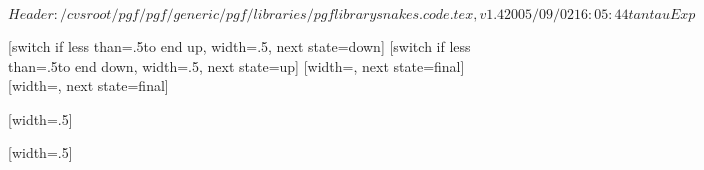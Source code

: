 \ProvidesPackageRCS[v\pgfversion] $Header: /cvsroot/pgf/pgf/generic/pgf/libraries/pgflibrarysnakes.code.tex,v 1.4 2005/09/02 16:05:44 tantau Exp $

%


\newdimen\pgfsnakewaveamplitude
\newdimen\pgfsnakewavelength
\pgfsnakewavelength=10pt
\pgfsnakewaveamplitude=2.5pt


%

{
  [switch if less than=.5\pgfsnakewavelength to end up,%
             width=.5\pgfsnakewavelength,%
             next state=down]
  {
    \pgfpathlineto{\pgfpoint{.25\pgfsnakewavelength}{\pgfsnakewaveamplitude}}
    \pgfpathlineto{\pgfpoint{.5\pgfsnakewavelength}{0pt}}
  }
  [switch if less than=.5\pgfsnakewavelength to end down,%
               width=.5\pgfsnakewavelength,%
               next state=up]
  {
    \pgfpathlineto{\pgfpoint{.25\pgfsnakewavelength}{-\pgfsnakewaveamplitude}}
    \pgfpathlineto{\pgfpoint{.5\pgfsnakewavelength}{0pt}}
  }
  [width=\pgfsnakeremainingdistance,
                 next state=final]
  {
    \pgfpathlineto{\pgfpoint{.5\pgfsnakeremainingdistance}{.5\pgfsnakeremainingdistance}}
    \pgfpathlineto{\pgfpoint{\pgfsnakeremainingdistance}{0pt}}
  }
  [width=\pgfsnakeremainingdistance,
                   next state=final]
  {
    \pgfpathlineto{\pgfpoint{.5\pgfsnakeremainingdistance}{-.5\pgfsnakeremainingdistance}}
    \pgfpathlineto{\pgfpoint{\pgfsnakeremainingdistance}{0pt}}
  }
}



%

{
  [width=.5\pgfsnakewavelength]
  {
    \pgfpathlineto{\pgfpoint{.5\pgfsnakewavelength}{2\pgfsnakewaveamplitude}}
    \pgfpathlineto{\pgfpoint{.5\pgfsnakewavelength}{0pt}}
  }
  {
    \pgfpathlineto{\pgfpoint{\pgfsnakeremainingdistance}{0pt}}
  }
}



%

{
  [width=.5\pgfsnakewavelength]
  {
    \pgfpathcurveto
    {\pgfpoint{0pt}{.555\pgfsnakewaveamplitude}}
    {\pgfpoint{0.11125\pgfsnakewavelength}{\pgfsnakewaveamplitude}}
    {\pgfpoint{.25\pgfsnakewavelength}{\pgfsnakewaveamplitude}}
    \pgfpathcurveto
    {\pgfpoint{.38875\pgfsnakewavelength}{\pgfsnakewaveamplitude}}
    {\pgfpoint{.5\pgfsnakewavelength}{.5\pgfsnakewaveamplitude}}
    {\pgfpoint{.5\pgfsnakewavelength}{0\pgfsnakewaveamplitude}}
  }
  {
    \pgfpathlineto{\pgfpoint{\pgfsnakeremainingdistance}{0pt}}
  }
}



